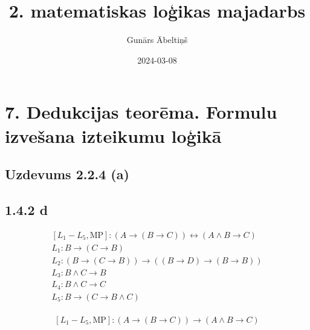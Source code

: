 \documentclass{article}
\title{2. matematiskas loģikas majadarbs}
\author{Gunārs Ābeltiņš}
\date{2024-03-08}
\begin{document}
\maketitle

\section*{7. Dedukcijas teorēma. Formulu izvešana izteikumu loģikā}

\subsection*{Uzdevums 2.2.4 (a)}

\subsection*{1.4.2 d}

\[
    \begin{array}{l}
        [L_1 - L_5, \text{MP}]: (A \rightarrow (B \rightarrow C)) \leftrightarrow (A \land B \rightarrow C)  \\
        L_1: B \rightarrow (C \rightarrow B)                                                                 \\
        L_2: (B \rightarrow (C \rightarrow B)) \rightarrow ((B \rightarrow D) \rightarrow (B \rightarrow B)) \\
        L_3: B \land C \rightarrow B                                                                         \\
        L_4: B \land C \rightarrow C                                                                         \\
        L_5: B \rightarrow (C \rightarrow B \land C)                                                         \\
    \end{array}
\]

\[
    [L_1 - L_5, \text{MP}]: (A \rightarrow (B \rightarrow C)) \rightarrow (A \land B \rightarrow C)
\]
\end{document}
